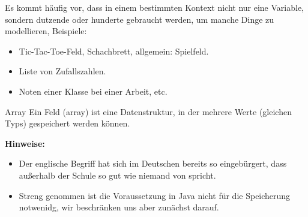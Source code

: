 \documentclass[fontsize=12pt]{article}
\begin{document}
\setlength{\headsep}{12pt}
Es kommt häufig vor, dass in einem bestimmten Kontext nicht nur eine Variable, sondern dutzende oder hunderte gebraucht werden, um manche Dinge zu modellieren, Beispiele:
\begin{itemize}
    \item Tic-Tac-Toe-Feld, Schachbrett, allgemein: Spielfeld.
    \item Liste von Zufallszahlen. 
    \item Noten einer Klasse bei einer Arbeit, etc. 
\end{itemize}

\begin{defi}{Array}
Ein Feld (array) ist eine Datenstruktur, in der mehrere Werte (gleichen Typs) gespeichert werden können.
\end{defi}

\textbf{Hinweise:}
\begin{itemize}
    \item Der englische Begriff  hat sich im Deutschen bereits so eingebürgert, dass außerhalb der Schule so gut wie niemand von  spricht. 
    \item Streng genommen ist die Voraussetzung  in Java nicht für die Speicherung notwenidg, wir beschränken uns aber zunächst darauf. 
\end{itemize}
\end{document}
